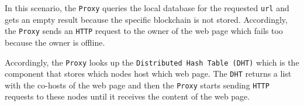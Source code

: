 In this scenario, the \texttt{Proxy} queries the local database for the requested \texttt{url}
and gets an empty result because the specific blockchain is not stored. Accordingly, the
\texttt{Proxy} sends an \texttt{HTTP} request to the owner of the web page which fails too
because the owner is offline.

Accordingly, the \texttt{Proxy} looks up the \texttt{Distributed Hash Table (DHT)} which is
the component that stores which nodes host which web page. The \texttt{DHT} returns a list
with the co-hosts of the web page and then the \texttt{Proxy} starts sending \texttt{HTTP}
requests to these nodes until it receives the content of the web page.
